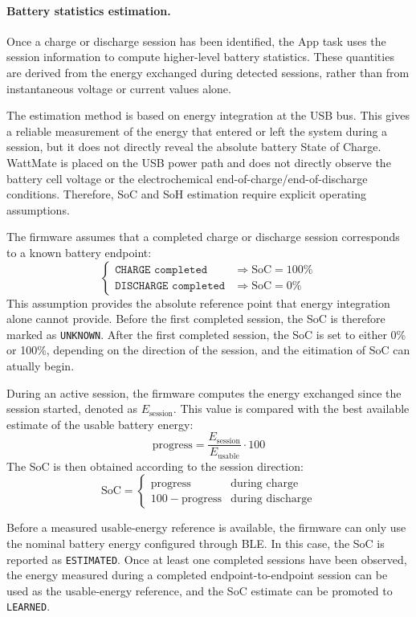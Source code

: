 \paragraph{Battery statistics estimation.}
Once a charge or discharge session has been identified, the App task uses the
session information to compute higher-level battery statistics. These quantities
are derived from the energy exchanged during detected sessions, rather than from
instantaneous voltage or current values alone.

The estimation method is based on energy integration at the USB bus. This gives
a reliable measurement of the energy that entered or left the system during a
session, but it does not directly reveal the absolute battery State of Charge.
WattMate is placed on the USB power path and does not directly observe the
battery cell voltage or the electrochemical end-of-charge/end-of-discharge
conditions. Therefore, SoC and SoH estimation require explicit operating
assumptions.

The firmware assumes that a completed charge or discharge session corresponds to
a known battery endpoint:
\[
\begin{cases}
	\texttt{CHARGE completed} & \Rightarrow \mathrm{SoC} = 100\% \\
	\texttt{DISCHARGE completed} & \Rightarrow \mathrm{SoC} = 0\%
\end{cases}
\]
This assumption provides the absolute reference point that energy integration
alone cannot provide. Before the first completed session, the SoC is therefore
marked as \texttt{UNKNOWN}. After the first completed session, the SoC is set to either 0\% or 100\%, depending on the direction of the session, and the eitimation of SoC can atually begin.

During an active session, the firmware computes the energy exchanged since the
session started, denoted as \(E_{\mathrm{session}}\). This value is compared with
the best available estimate of the usable battery energy:
\[
\mathrm{progress} =
\frac{E_{\mathrm{session}}}{E_{\mathrm{usable}}} \cdot 100
\]
The SoC is then obtained according to the session direction:
\[
\mathrm{SoC} =
\begin{cases}
	\mathrm{progress} & \text{during charge} \\
	100 - \mathrm{progress} & \text{during discharge}
\end{cases}
\]

Before a measured usable-energy reference is available, the firmware can only use
the nominal battery energy configured through BLE. In this case, the SoC is
reported as \texttt{ESTIMATED}. Once at least one completed sessions have been observed, the energy measured during a completed endpoint-to-endpoint session can be used as the usable-energy reference, and the SoC estimate can be promoted to \texttt{LEARNED}.

